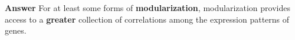\begin{frame}
\begin{block}{\textbf{Answer}}
For at least some forms of \textbf{modularization}, modularization provides access to a \textbf{greater} collection of correlations among the expression patterns of genes.
\end{block}
\end{frame}